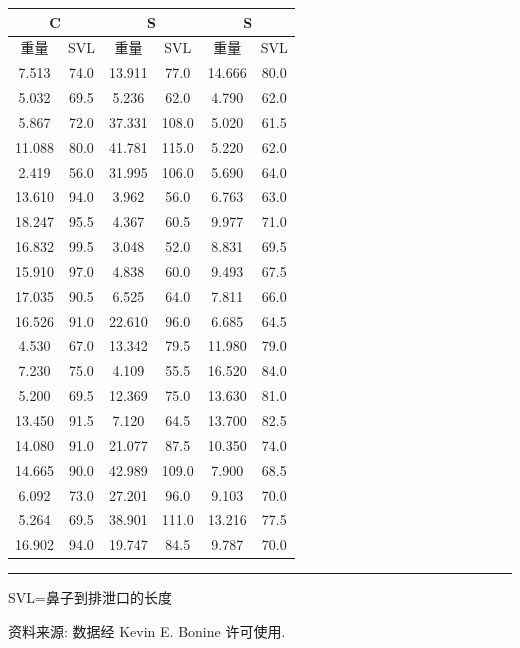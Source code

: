 \begin{mvtable}
\label{tab:6.7}
\begin{tabular}{cc|cc|cc}
\multicolumn{2}{c}{C} & \multicolumn{2}{c}{S} & \multicolumn{2}{c}{S}\\\midrule
重量&SVL&重量&SVL&重量&SVL\\\midrule
7.513&74.0&13.911&77.0&14.666&80.0\\
5.032&69.5&5.236&62.0&4.790&62.0\\
5.867&72.0&37.331&108.0&5.020&61.5\\
11.088&80.0&41.781&115.0&5.220&62.0\\
2.419&56.0&31.995&106.0&5.690&64.0\\
13.610&94.0&3.962&56.0&6.763&63.0\\
18.247&95.5&4.367&60.5&9.977&71.0\\
16.832&99.5&3.048&52.0&8.831&69.5\\
15.910&97.0&4.838&60.0&9.493&67.5\\
17.035&90.5&6.525&64.0&7.811&66.0\\
16.526&91.0&22.610&96.0&6.685&64.5\\
4.530&67.0&13.342&79.5&11.980&79.0\\
7.230&75.0&4.109&55.5&16.520&84.0\\
5.200&69.5&12.369&75.0&13.630&81.0\\
13.450&91.5&7.120&64.5&13.700&82.5\\
14.080&91.0&21.077&87.5&10.350&74.0\\
14.665&90.0&42.989&109.0&7.900&68.5\\
6.092&73.0&27.201&96.0&9.103&70.0\\
5.264&69.5&38.901&111.0&13.216&77.5\\
16.902&94.0&19.747&84.5&9.787&70.0\\
\end{tabular}
\end{mvtable}

\vspace{2pt}
\noindent\rule{\linewidth}{0.4pt}

\noindent\small SVL=鼻子到排泄口的长度

\noindent\small 资料来源: 数据经 Kevin E. Bonine 许可使用.
